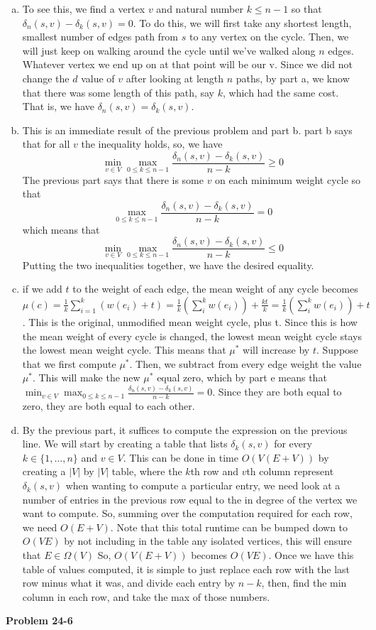 \documentclass{article}
\begin{document}
\begin{enumerate}[a.]
\item
To see this, we find a vertex $v$ and natural number $k\le n-1$ so that $\delta_n(s,v) - \delta_k(s,v) =0$. To do this, we will first take any shortest length, smallest number of edges path from $s$ to any vertex on the cycle. Then, we will just keep on walking around the cycle until we've walked along $n$ edges. Whatever vertex we end up on at that point will be our v. Since we did not change the $d$ value of $v$ after looking at length $n$ paths, by part a, we know that there was some length of this path, say $k$, which had the same cost. That is, we have $\delta_n(s,v) = \delta_k(s,v)$.

\item
This is an immediate result of the previous problem and part b. part b says that for all $v$ the inequality holds, so, we have
\[
\min_{v\in V} \max_{0\le k\le n-1} \frac{\delta_n(s,v) - \delta_k(s,v)}{n-k} \ge 0
\]
The previous part says that there is some $v$ on each minimum weight cycle so that
\[
\max_{0\le k\le n-1} \frac{\delta_n(s,v) - \delta_k(s,v)}{n-k} = 0
\]
which means that
\[
\min_{v\in V} \max_{0\le k\le n-1} \frac{\delta_n(s,v) - \delta_k(s,v)}{n-k} \le 0
\]
Putting the two inequalities together, we have the desired equality.

\item
if we add $t$ to the weight of each edge, the mean weight of any cycle becomes $\mu(c)= \frac{1}{k} \sum_{i=1}^k(w(e_i) + t) = \frac{1}{k}\left(\sum_{i}^kw(e_i)\right) + \frac{kt}{k} = \frac{1}{k}\left(\sum_{i}^kw(e_i)\right) + t$. This is the original, unmodified mean weight cycle, plus t. Since this is how the mean weight of every cycle is changed, the lowest mean weight cycle stays the lowest mean weight cycle. This means that $\mu^*$ will increase by $t$. Suppose that we first compute $\mu^*$. Then, we subtract from every edge weight the value $\mu^*$. This will make the new $\mu^*$ equal zero, which by part e means that $\min_{v\in V} \max_{0\le k\le n-1} \frac{\delta_n(s,v) - \delta_k(s,v)}{n-k} =0$. Since they are both equal to zero, they are both equal to each other.

\item
By the previous part, it suffices to compute the expression on the previous line. We will start by creating a table that lists $\delta_k(s,v)$ for every $k\in \{1,\ldots, n\}$ and $v\in V$. This can be done in time $O(V(E+V))$ by creating a $|V|$ by $|V|$ table, where the $k$th row and $v$th column represent $\delta_k(s,v)$ when wanting to compute a particular entry, we need look at a number of entries in the previous row equal to the in degree of the vertex we want to compute. So, summing over the computation required for each row, we need $O(E+V)$. Note that this total runtime can be bumped down to $O(VE)$ by not including in the table any isolated vertices, this will ensure that $E \in \Omega(V)$ So, $O(V(E+V))$ becomes $O(VE)$. Once we have this table of values computed, it is simple to just replace each row with the last row minus what it was, and divide each entry by $n-k$, then, find the min column in each row, and take the max of those numbers.

\end{enumerate}

\noindent\textbf{Problem 24-6}\\

\end{document}
